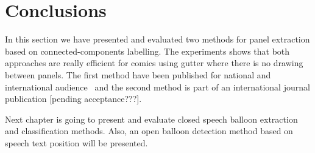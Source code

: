 \section{Conclusions}
\label{sec:pe:conclusion}
In this section we have presented and evaluated two methods for panel extraction based on connected-components labelling.
The experiments shows that both approaches are really efficient for comics using gutter where there is no drawing between panels.
The first method have been published for national and international audience~\cite{rigaud2012extraction,Rigaud2012LNCS} and the second method is part of an international journal publication [pending acceptance???].


Next chapter is going to present and evaluate closed speech balloon extraction and classification methods.
Also, an open balloon detection method based on speech text position will be presented.


